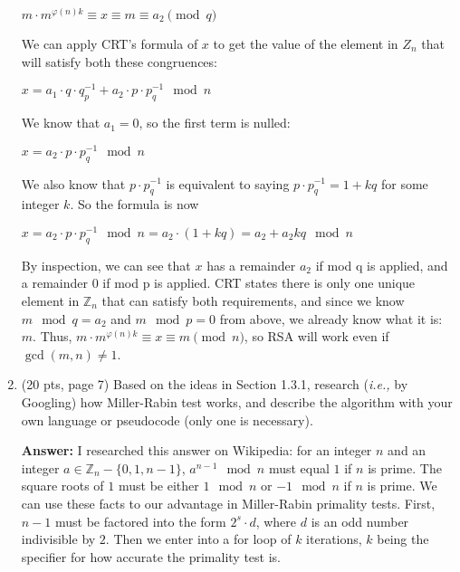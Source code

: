\documentclass[10pt]{article}
\begin{document}
\begin{enumerate}
\begin{center}
    $m\cdot m^{\varphi(n)k} \equiv x \equiv m \equiv a_2 \pmod q$
    \end{center}
    We can apply CRT's formula of $x$ to get the value of the element in $Z_n$ that will satisfy both these congruences: 
    \begin{center}
    $x = a_1\cdot q\cdot q^{-1}_p + a_2\cdot p\cdot p^{-1}_q \mod n$
    \end{center}
    We know that $a_1 = 0$, so the first term is nulled:
    \begin{center}
    $x = a_2\cdot p\cdot p^{-1}_q \mod n$
    \end{center}
    We also know that $p \cdot p^{-1}_q$ is equivalent to saying $p \cdot p^{-1}_q = 1 + kq$ for some integer $k$. So the formula is now 
    \begin{center}
    $x = a_2\cdot p\cdot p^{-1}_q \mod n = a_2\cdot (1+kq) = a_2+a_2kq \mod n$
    \end{center}
    By inspection, we can see that $x$ has a remainder $a_2$ if mod q is applied, and a remainder $0$ if mod p is applied. CRT states there is only one unique element in $\mathbb{Z}_n$ that can satisfy both requirements, and since we know $m \mod q = a_2$ and $m \mod p = 0$ from above, we already know what it is: $m$. Thus, $m\cdot m^{\varphi(n)k} \equiv x \equiv m \pmod n$, so RSA will work even if $\gcd(m, n) \neq 1$.
	
	
	\bigskip\item (20 pts, page 7) Based on the ideas in Section 1.3.1, research (\textit{i.e.,} by Googling) how Miller-Rabin test works, and describe the algorithm
	with your own language or pseudocode (only one is necessary).
	
	\textbf{Answer:}\newline
     I researched this answer on Wikipedia: for an integer $n$ and an integer $a\in \mathbb{Z}_n - \{0,1,n-1\}$, $a^{n-1}\mod n$ must equal $1$ if $n$ is prime. The square roots of $1$ must be either $1 \mod n$ or $-1 \mod n$ if $n$ is prime. We can use these facts to our advantage in Miller-Rabin primality tests. First, $n-1$ must be factored into the form $2^s\cdot d$, where $d$ is an odd number indivisible by $2$. Then we enter into a for loop of $k$ iterations, $k$ being the specifier for how accurate the primality test is.
    

\end{enumerate}
\end{document}

